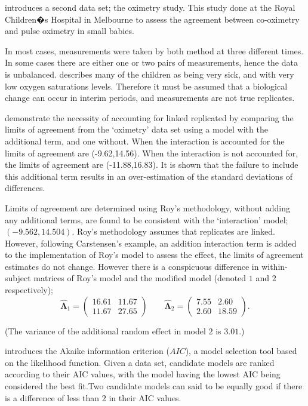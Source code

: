 \documentclass[12pt, a4paper]{report}
\theoremstyle{plain}
\theoremstyle{definition}
\theoremstyle{remark}
\begin{document}
	\citet{BXC2008} introduces a second data set; the oximetry study. This study done at the Royal Children�s Hospital in
	Melbourne to assess the agreement between co-oximetry and pulse oximetry in small babies.
	
	In most cases, measurements were taken by both method at three different times. In some cases there are either one or two pairs of measurements, hence the data is unbalanced. \citet{BXC2008} describes many of the children as being very sick, and with very low oxygen saturations levels. Therefore it must be assumed that a biological change can occur in interim periods, and measurements are not true replicates.
	
	\citet{BXC2008} demonstrate the necessity of accounting for linked replicated by comparing the limits of agreement from the `oximetry' data set using a model with the additional term, and one without. When the interaction is accounted for the limits of agreement are (-9.62,14.56). When the interaction is not accounted for, the limits of agreement are (-11.88,16.83). It is shown that the failure to include this additional term results in an over-estimation of the standard deviations of differences.
	
	Limits of agreement are determined using Roy's methodology, without adding any additional terms, are found to be consistent with the `interaction' model; $(-9.562, 14.504 )$. Roy's methodology assumes that replicates are linked. However, following Carstensen's example, an addition interaction term is added to the implementation of Roy's model to assess the effect, the limits of agreement estimates do not change. However there is a conspicuous difference in within-subject matrices of Roy's model and the modified model (denoted $1$ and $2$ respectively);
	\begin{equation}
	\hat{\boldsymbol{\Lambda}}_{1}= \left(\begin{array}{cc}
	16.61 &	11.67\\
	11.67 & 27.65 \end{array}\right) \qquad
	\boldsymbol{\hat{\Lambda}}_{2}= \left( \begin{array}{cc}
	7.55 & 2.60 \\
	2.60 & 18.59 \end{array} \right). 
	\end{equation}
	
	\noindent (The variance of the additional random effect in model $2$ is $3.01$.)
	
	\citet{akaike} introduces the Akaike information criterion ($AIC$), a model 
	selection tool based on the likelihood function. Given a data set, candidate models
	are ranked according to their AIC values, with the model having the lowest AIC being considered the best fit.Two candidate models can said to be equally good if there is a difference of less than $2$ in their AIC values.
	
\end{document}
